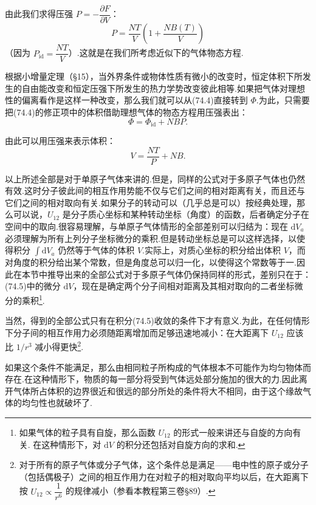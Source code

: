由此我们求得压强 $P=-\dfrac{\partial F}{\partial V}$：
\begin{equation}
  P=\frac{NT}{V}\left(1+\frac{NB(T)}{V}\right)
\end{equation}
（因为 $P_{\mathrm{id}}=\dfrac{NT}{V}$）.这就是在我们所考虑近似下的气体物态方程.

根据小增量定理（§15），当外界条件或物体性质有微小的改变时，恒定体积下所发生的自由能改变和恒定压强下所发生的热力学势改变彼此相等.如果把气体对理想性的偏离看作是这样一种改变，那么我们就可以从(74.4)直接转到 $\varPhi$.为此，只需要把(74.4)的修正项中的体积借助理想气体的物态方程用压强表出：
\begin{equation}
  \varPhi=\varPhi_{\mathrm{id}}+NBP.
\end{equation}

由此可以用压强来表示体积：
\begin{equation}
  V=\frac{NT}{P}+NB.
\end{equation}

以上所述全部是对于单原子气体来讲的.但是，同样的公式对于多原子气体也仍然有效.这时分子彼此间的相互作用势能不仅与它们之间的相对距离有关，而且还与它们之间的相对取向有关.如果分子的转动可以（几乎总是可以）按经典处理，那么可以说，$U_{12}$ 是分子质心坐标和某种转动坐标（角度）的函数，后者确定分子在空间中的取向.很容易理解，与单原子气体情形的全部差别可以归结为：现在 $\mathrm{d}V_a$ 必须理解为所有上列分子坐标微分的乘积.但是转动坐标总是可以这样选择，以使得积分 $\int\mathrm{d}V_a$ 仍然等于气体的体积 $V$.实际上，对质心坐标的积分给出体积 $V$，而对角度的积分给出某个常数，但是角度总可以归一化，以使得这个常数等于一.因此在本节中推导出来的全部公式对于多原子气体仍保持同样的形式，差别只在于：(74.5)中的微分 $\mathrm{d}V$，现在是确定两个分子间相对距离及其相对取向的二者坐标微分的乘积\footnote{如果气体的粒子具有自旋，那么函数 $U_{12}$ 的形式一般来讲还与自旋的方向有关. 在这种情形下，对 $\mathrm{d}V$ 的积分还包括对自旋方向的求和.}.

当然，得到的全部公式只有在积分(74.5)收敛的条件下才有意义.为此，在任何情形下分子间的相互作用力必须随距离增加而足够迅速地减小：在大距离下 $U_{12}$ 应该比 $1/r^3$ 减小得更快\footnote{对于所有的原子气体或分子气体，这个条件总是满足——电中性的原子或分子（包括偶极子）之间的相互作用力在对粒子的相对取向平均以后，在大距离下按 $U_{12}\propto\dfrac{1}{r^6}$ 的规律减小（参看本教程第三卷§89）.}.

如果这个条件不能满足，那么由相同粒子所构成的气体根本不可能作为均匀物体而存在.在这种情形下，物质的每一部分将受到气体远处部分施加的很大的力.因此离开气体所占体积的边界很近和很远的部分所处的条件将大不相同，由于这个缘故气体的均匀性也就破坏了.

